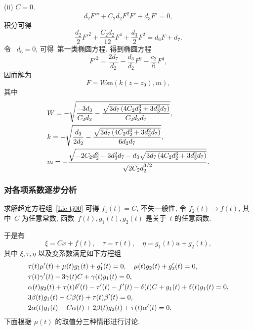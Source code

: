 (ii) $C=0$.
\begin{equation*}
d_2 F'''+C_2d_2 F^2F'+d_3 F'=0,
\end{equation*}
积分可得
\begin{equation}
\frac{d_2}{2}F'^2+\frac{C_2d_2}{12}F^4+\frac{d_3}{2}F^2=d_6 F+d_7.
\end{equation}
令~ $d_6=0$, 可得~第一类椭圆方程.
得到椭圆方程
\begin{equation}
F'^2=\frac{2d_7}{d_2}-\frac{d_3}{d_2}F^2-\frac{c_2}{6}F^4,
\end{equation}
因而解为
\begin{equation}
F=W \text{sn}(k(z-z_0),m),
\end{equation}
其中
\begin{equation}
\begin{aligned}
&W=-\sqrt{\frac{-3 d_3}{C_2d_2}-\frac{\sqrt{3 d_7 \left(4 C_2 d_2^3+3 d_3^2 d_7\right)}}{C_2d_2d_7}},\notag\\
&k=-\sqrt{\frac{ d_3}{2d_2}-\frac{\sqrt{3d_7 \left(4 C_2 d_2^3+3 d_3^2 d_7\right)}}{6 d_2 d_7}},\notag\\
&m=-\frac{\sqrt {-2 C_2 d_2^3-3 d_3^2 d_7- d_3 \sqrt{3d_7 \left(4 C_2 d_2^3+3 d_3^2 d_7\right)}}}{\sqrt{2 C_2} d_2^{3/2}}.
\end{aligned}
\end{equation}

\subsubsection{对各项系数逐步分析}

求解超定方程组~\eqref{Lie-tj00} 可得
$f_1(t)=C$, 不失一般性, 令 $f_2(t)\rightarrow f(t)$,
其中~$C$ 为任意常数, 函数~$f(t), g_1(t), g_2(t)$ 是关于~$t$ 的任意函数.

于是有
\begin{equation}
\xi=C x+f(t),\quad \tau=\tau(t),\quad \eta=g_1(t)u+g_2(t),
\end{equation}
其中 $\xi, \tau, \eta$ 以及变系数满足如下方程组
\begin{equation}
\begin{aligned}\label{Lie-tj}%
  &\tau(t)\mu'(t)+\mu(t)g_1(t)+g_1'(t)=0,\quad \mu(t)g_2(t)+g_2'(t)=0,\\
  &\tau(t)\gamma'(t)-3\gamma(t)C+\gamma(t)g_1(t)=0,\\
  &\alpha(t)g_2(t)+\tau(t)\delta'(t)-\tau'(t)-f'(t)-\delta(t)C+g_1(t)+\delta(t)g_1(t)=0,\notag\\ &3\beta(t)g_1(t)-C\beta(t)+\tau(t)\beta'(t)=0,\\
  &2\alpha(t)g_1(t)-C \alpha(t)+2\beta(t)g_2(t)+\tau(t)\alpha'(t)=0. %
\end{aligned}
\end{equation}
下面根据 $\mu(t)$ 的取值分三种情形进行讨论.

